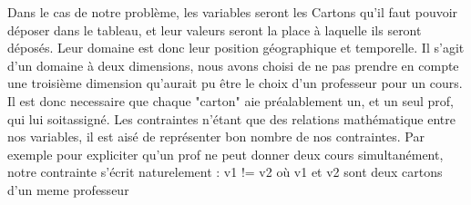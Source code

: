 \begin{center}
\end{center}

\indent

Dans le cas de notre problème, les variables seront les Cartons qu'il faut pouvoir déposer dans le tableau, et leur valeurs seront la place à laquelle ils seront déposés.
Leur domaine est donc leur position géographique et temporelle. 
Il s'agit d'un domaine à deux dimensions, nous avons choisi de ne pas prendre en compte une troisième dimension qu'aurait pu être le choix 
d'un professeur pour un cours. 
Il est donc necessaire que chaque "carton" aie préalablement un, et un seul prof, qui lui soitassigné.
Les contraintes n'étant que des relations mathématique entre nos variables, il est aisé de représenter bon nombre de nos contraintes. 
Par exemple pour expliciter qu'un prof ne peut donner deux cours simultanément, notre contrainte s'écrit naturelement :
v1 != v2 où v1 et v2 sont deux cartons d'un meme professeur
% 
% 
